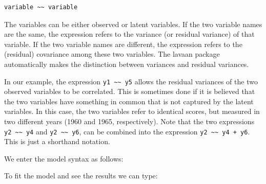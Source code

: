 \begin{verbatim}
variable ~~ variable
\end{verbatim}

The variables can be either observed or latent variables. If the two
variable names are the same, the expression refers to the variance (or
residual variance) of that variable. If the two variable names are
different, the expression refers to the (residual) covariance among
these two variables. The lavaan package automatically makes the
distinction between variances and residual variances.

In our example, the expression
\texttt{y1 \textasciitilde{}\textasciitilde{} y5} allows the residual
variances of the two observed variables to be correlated. This is
sometimes done if it is believed that the two variables have something
in common that is not captured by the latent variables. In this case,
the two variables refer to identical scores, but measured in two
different years (1960 and 1965, respectively). Note that the two
expressions \texttt{y2 \textasciitilde{}\textasciitilde{} y4} and
\texttt{y2 \textasciitilde{}\textasciitilde{} y6}, can be combined into
the expression \texttt{y2 \textasciitilde{}\textasciitilde{}~y4 + y6}.
This is just a shorthand notation.

We enter the model syntax as follows:

\begin{Shaded}
\begin{Highlighting}[]
\end{Highlighting}
\end{Shaded}

To fit the model and see the results we can type:

\begin{Shaded}
\begin{Highlighting}[]
\StringTok{ } 
 \NormalTok{)}
\end{Highlighting}
\end{Shaded}

